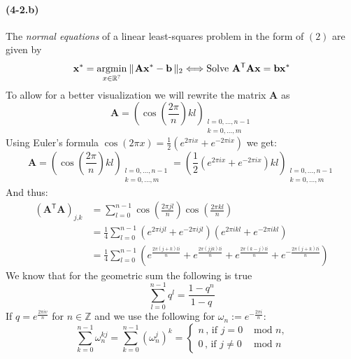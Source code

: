 \documentclass{article}
\begin{document}
\paragraph{\textbf{(4-2.b)}}
The \textit{normal equations} of a linear least-squares problem in the form of $\left(2\right)$ are given by
\begin{equation*}
      \mathbf{x}^{*} = \underset{x \in \mathbb{R}^{?}}{\text{argmin}} \: \lVert \hspace{1px} \mathbf{A}\mathbf{x}^{*} - \mathbf{b} \,\rVert_{2} \Longleftrightarrow \text{Solve } \mathbf{A}^{\mathsf{T}}\mathbf{A}\mathbf{x} = \mathbf{b}\mathbf{x}^{*}
\end{equation*}
To allow for a better visualization we will rewrite the matrix $\mathbf{A}$ as
\begin{equation*}
    \mathbf{A} = \left(\cos\left(\frac{2\pi}{n}\right)kl\right)_{\substack{l = 0,...,n-1 \\ k=0,...,m}}
\end{equation*}
Using Euler's formula $\cos\left(2\pi x\right) = \frac{1}{2}\left(e^{2\pi i x} + e^{-2\pi i x}\right)$ we get:
\begin{equation*}
    \mathbf{A} = \left(\cos\left(\frac{2\pi}{n}\right)kl\right)_{\substack{l = 0,...,n-1 \\ k=0,...,m}} = \left(\frac{1}{2}\left(e^{2\pi i x} + e^{-2\pi i x}\right)kl\right)_{\substack{l = 0,...,n-1 \\ k=0,...,m}}
\end{equation*}
And thus:
\begin{align*}
    \left(\mathbf{A}^{\mathsf{T}}\mathbf{A}\right)_{j\text{,}k} &= \sum_{l=0}^{n-1}\cos\left(\frac{2\pi jl}{n}\right)\cos\left(\frac{2\pi k l}{n}\right) \\
    &=\frac{1}{4}\sum_{l=0}^{n-1}\left(e^{2\pi i jl} + e^{-2 \pi i jl}\right)\left(e^{2\pi i kl} + e^{-2 \pi i kl}\right) \\
    &= \frac{1}{4}\sum_{l=0}^{n-1}\left(e^{\frac{2 \pi\left(j+k\right)li}{n}} +e^{\frac{2 \pi\left(jjk\right)li}{n}}+ e^{\frac{2 \pi\left(k-j\right)li}{n}}+e^{-\frac{2 \pi\left(j+k\right)li}{n}}\right)
\end{align*}
\pagebreak
We know that for the geometric sum the following is true
\begin{equation*}
    \sum_{l=0}^{n-1}q^{l} = \frac{1-q^{n}}{1-q}
\end{equation*}
If $q = e^{\frac{2\pi iv}{n}}$ for $n \in \mathbb{Z}$ and we use the following for $\omega_{n} := e^{-\frac{2\pi i}{n}}$:
\begin{equation*}
    \sum_{k=0}^{n-1}\omega_{n}^{kj} =\sum_{k=0}^{n-1}\left(\omega_{n}^{j}\right)^{k} =
    \begin{cases}
    n\,\text{, if } j = 0 &\text{ mod } n \text{,} \\
    0 \,\text{, if } j \neq 0 &\text{ mod } n
    \end{cases}
\end{equation*}
\end{document}
